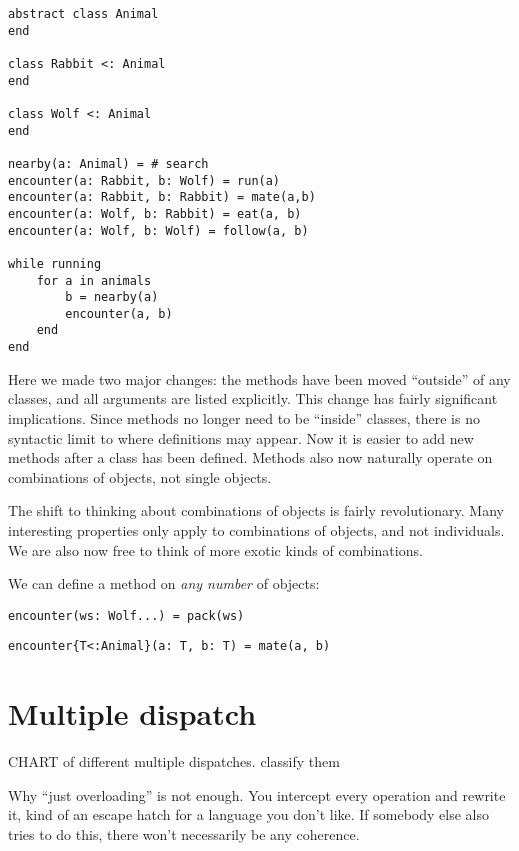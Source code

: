 \begin{verbatim}
abstract class Animal
end

class Rabbit <: Animal
end

class Wolf <: Animal
end

nearby(a: Animal) = # search
encounter(a: Rabbit, b: Wolf) = run(a)
encounter(a: Rabbit, b: Rabbit) = mate(a,b)
encounter(a: Wolf, b: Rabbit) = eat(a, b)
encounter(a: Wolf, b: Wolf) = follow(a, b)

while running
    for a in animals
        b = nearby(a)
        encounter(a, b)
    end
end
\end{verbatim}

Here we made two major changes: the methods have been moved ``outside''
of any classes, and all arguments are listed explicitly. This change
has fairly significant implications. Since methods no longer need to be
``inside'' classes, there is no syntactic limit to where definitions
may appear. Now it is easier to add new methods after a class has
been defined. Methods also now naturally operate on combinations of
objects, not single objects.

The shift to thinking about combinations of objects is fairly
revolutionary. Many interesting properties only apply to combinations
of objects, and not individuals. We are also now free to think of
more exotic kinds of combinations.

We can define a method on \emph{any number} of objects:

\begin{verbatim}
encounter(ws: Wolf...) = pack(ws)
\end{verbatim}



\begin{verbatim}
encounter{T<:Animal}(a: T, b: T) = mate(a, b)
\end{verbatim}


\section{Multiple dispatch}

CHART of different multiple dispatches. classify them

Why ``just overloading'' is not enough. You intercept every operation and
rewrite it, kind of an escape hatch for a language you don't like. If
somebody else also tries to do this, there won't necessarily be any
coherence.

